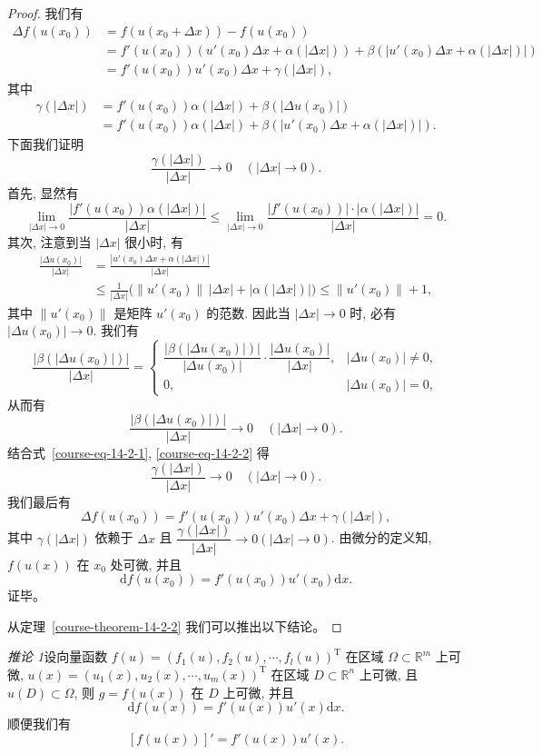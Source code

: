 \documentclass[UTF8,12pt,a4paper,fontset=fandol]{ctexart}
\begin{document}
\begin{proof}
我们有
\[
\begin{aligned}
  \Delta f(u(x_0))
  &=f(u(x_0+\Delta x))-f(u(x_0))\\
  &=f'(u(x_0))(u'(x_0)\Delta x+\alpha(|\Delta x|))
  +\beta(|u'(x_0)\Delta x+\alpha(|\Delta x|)|)\\
  &=f'(u(x_0))u'(x_0)\Delta x+\gamma(|\Delta x|),
\end{aligned}
\]
其中
\[
\begin{aligned}
  \gamma(|\Delta x|)
  &=f'(u(x_0))\alpha(|\Delta x|)
  +\beta(|\Delta u(x_0)|)\\
  &=f'(u(x_0))\alpha(|\Delta x|)
  +\beta(|u'(x_0)\Delta x+\alpha(|\Delta x|)|).
\end{aligned}
\]
下面我们证明
\[
  \frac{\gamma(|\Delta x|)}{|\Delta x|}\to0\quad(|\Delta x|\to0).
\]
首先, 显然有
\begin{equation}
  \lim_{|\Delta x|\to0}
  \frac{|f'(u(x_0))\alpha(|\Delta x|)|}{|\Delta x|}
  \leqslant
  \lim_{|\Delta x|\to0}
  \frac{|f'(u(x_0))|\cdot|\alpha(|\Delta x|)|}{|\Delta x|}=0.
\label{course-eq-14-2-1}
\end{equation}
其次, 注意到当 $|\Delta x|$ 很小时, 有
\[
\begin{aligned}
  \frac{|\Delta u(x_0)|}{|\Delta x|}
  &=\frac{|u'(x_0)\Delta x+\alpha(|\Delta x|)|}{|\Delta x|}\\
  &\leqslant \frac1{|\Delta x|}\bigl(\|u'(x_0)\|\,|\Delta x|+|\alpha(|\Delta x|)|\bigr)
  \leqslant \|u'(x_0)\|+1,
\end{aligned}
\]
其中 $\|u'(x_0)\|$ 是矩阵 $u'(x_0)$ 的范数. 因此当 $|\Delta x|\to0$ 时, 必有 $|\Delta u(x_0)|\to0$. 我们有
\[
  \frac{|\beta(|\Delta u(x_0)|)|}{|\Delta x|}
  =
  \begin{cases}
    \dfrac{|\beta(|\Delta u(x_0)|)|}{|\Delta u(x_0)|}
    \cdot\dfrac{|\Delta u(x_0)|}{|\Delta x|}, &|\Delta u(x_0)|\ne0,\\[1.2em]
    0, &|\Delta u(x_0)|=0,
  \end{cases}
\]
从而有
\begin{equation}
  \frac{|\beta(|\Delta u(x_0)|)|}{|\Delta x|}\to0
  \quad(|\Delta x|\to0).
\label{course-eq-14-2-2}
\end{equation}
结合式~\eqref{course-eq-14-2-1}, \eqref{course-eq-14-2-2}  得
\[
  \frac{\gamma(|\Delta x|)}{|\Delta x|}\to0\quad(|\Delta x|\to0).
\]
我们最后有
\[
  \Delta f(u(x_0))=f'(u(x_0))u'(x_0)\Delta x+\gamma(|\Delta x|),
\]
其中 $\gamma(|\Delta x|)$ 依赖于 $\Delta x$ 且 $\dfrac{\gamma(|\Delta x|)}{|\Delta x|}\to0(|\Delta x|\to0)$. 由微分的定义知, $f(u(x))$ 在 $x_0$ 处可微, 并且
\[
  \mathrm df(u(x_0))=f'(u(x_0))u'(x_0)\mathrm dx.
\]
证毕。

从定理~\ref{course-theorem-14-2-2}  我们可以推出以下结论。

\end{proof}
\noindent\emph{推论 1}\quad 设向量函数 $f(u)=(f_1(u),f_2(u),\cdots,f_l(u))^\mathrm T$ 在区域 $\Omega\subset\mathbb R^m$ 上可微, $u(x)=(u_1(x),u_2(x),\cdots,u_m(x))^\mathrm T$ 在区域 $D\subset\mathbb R^n$ 上可微, 且 $u(D)\subset\Omega$, 则 $g=f(u(x))$ 在 $D$ 上可微, 并且
\[
  \mathrm df(u(x))=f'(u(x))u'(x)\mathrm dx.
\]
顺便我们有
\[
  [f(u(x))]'=f'(u(x))u'(x).
\]
\end{document}
